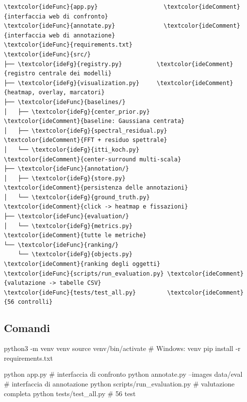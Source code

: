 \begin{idebox}
\begin{Verbatim}[commandchars=\\\{\},fontsize=\footnotesize]
\textcolor{ideFunc}{app.py}                   \textcolor{ideComment}{interfaccia web di confronto}
\textcolor{ideFunc}{annotate.py}              \textcolor{ideComment}{interfaccia web di annotazione}
\textcolor{ideFunc}{requirements.txt}
\textcolor{ideFunc}{src/}
├── \textcolor{ideFg}{registry.py}          \textcolor{ideComment}{registro centrale dei modelli}
├── \textcolor{ideFg}{visualization.py}     \textcolor{ideComment}{heatmap, overlay, marcatori}
├── \textcolor{ideFunc}{baselines/}
│   ├── \textcolor{ideFg}{center_prior.py}       \textcolor{ideComment}{baseline: Gaussiana centrata}
│   ├── \textcolor{ideFg}{spectral_residual.py}  \textcolor{ideComment}{FFT + residuo spettrale}
│   └── \textcolor{ideFg}{itti_koch.py}          \textcolor{ideComment}{center-surround multi-scala}
├── \textcolor{ideFunc}{annotation/}
│   ├── \textcolor{ideFg}{store.py}              \textcolor{ideComment}{persistenza delle annotazioni}
│   └── \textcolor{ideFg}{ground_truth.py}       \textcolor{ideComment}{click -> heatmap e fissazioni}
├── \textcolor{ideFunc}{evaluation/}
│   └── \textcolor{ideFg}{metrics.py}            \textcolor{ideComment}{tutte le metriche}
└── \textcolor{ideFunc}{ranking/}
    └── \textcolor{ideFg}{objects.py}            \textcolor{ideComment}{ranking degli oggetti}
\textcolor{ideFunc}{scripts/run_evaluation.py} \textcolor{ideComment}{valutazione -> tabelle CSV}
\textcolor{ideFunc}{tests/test_all.py}         \textcolor{ideComment}{56 controlli}
\end{Verbatim}
\end{idebox}

\subsection{Comandi}

\begin{idebox}
\begin{bashcode}
python3 -m venv venv
source venv/bin/activate          # Windows: venv\Scripts\activate
pip install -r requirements.txt

python app.py                     # interfaccia di confronto
python annotate.py --images data/eval   # interfaccia di annotazione
python scripts/run_evaluation.py  # valutazione completa
python tests/test_all.py          # 56 test
\end{bashcode}
\end{idebox}

